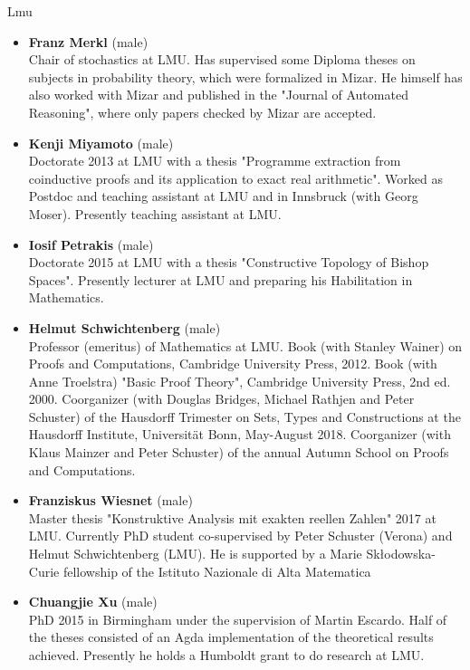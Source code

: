 \begin{sitedescription}{Lmu}
\begin{itemize}
\item \textbf{Franz Merkl} (male)\\
Chair of stochastics at LMU.  Has supervised some
Diploma theses on subjects in probability theory, which were
formalized in Mizar.  He himself has also worked with Mizar and
published in the "Journal of Automated Reasoning", where only papers
checked by Mizar are accepted.

\item \textbf{Kenji Miyamoto} (male)\\
Doctorate 2013 at LMU with a thesis "Programme
extraction from coinductive proofs and its application to exact real
arithmetic".  Worked as Postdoc and teaching assistant at LMU and in
Innsbruck (with Georg Moser).  Presently teaching assistant at LMU.

\item \textbf{Iosif Petrakis} (male)\\
Doctorate 2015 at LMU with a thesis  "Constructive
Topology of Bishop Spaces".  Presently lecturer at LMU and preparing
his Habilitation in Mathematics.  

\item \textbf{Helmut Schwichtenberg} (male)\\
Professor (emeritus) of Mathematics at LMU.
Book (with Stanley Wainer) on Proofs and Computations, Cambridge
University Press, 2012.  Book (with Anne Troelstra) "Basic Proof
Theory", Cambridge University Press, 2nd ed. 2000.  Coorganizer (with
Douglas Bridges, Michael Rathjen and Peter Schuster) of the Hausdorff
Trimester on Sets, Types and Constructions at the Hausdorff
Institute, Universit\"at Bonn, May-August 2018.  Coorganizer (with
Klaus Mainzer and Peter Schuster) of the annual Autumn School on
Proofs and Computations.

\item \textbf{Franziskus Wiesnet} (male)\\
Master thesis "Konstruktive Analysis mit exakten
reellen Zahlen" 2017 at LMU.  Currently PhD student co-supervised by
Peter Schuster (Verona) and Helmut Schwichtenberg (LMU).  He is
supported by a Marie Sk{\l}odowska-Curie fellowship of the Istituto
Nazionale di Alta Matematica

\item \textbf{Chuangjie Xu} (male)\\
PhD 2015 in Birmingham under the supervision of Martin
Escardo.  Half of the theses consisted of an Agda implementation of
the theoretical results achieved.  Presently he holds a Humboldt grant
to do research at LMU.


\end{itemize}
\end{sitedescription}
